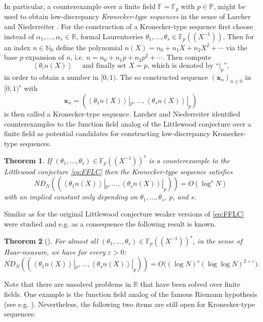 \documentclass{article}
\newcommand{\bsx}{\boldsymbol{x}}%
\newcommand{\NN}{\mathbb N}
\newcommand{\RR}{\mathbb R}
\newcommand{\PP}{\mathbb P}
\newcommand{\FF}{\mathbb{F}}
\renewcommand{\(}{\left (}
\renewcommand{\)}{\right )}
\newtheorem{theorem}{Theorem}[section]
\theoremstyle{definition}
\numberwithin{equation}{section}
\begin{document}
In particular, a counterexample over a finite field $\FF=\FF_p$ with $p\in\PP$, might be used to obtain low-discrepancy \textit{Kronecker-type sequences} in the sense of Larcher and Niederreiter \cite{LarNie1993}. %
For the construction of a Kronecker-type sequence first choose instead of $\alpha_1,\ldots,\alpha_s\in\RR$, formal Laurentseries $\theta_1,\ldots,\theta_s\in\FF_p((X^{-1}))$. Then for an index $n\in\NN_0$ define the polynomial $n(X)=n_0+n_1X+n_2X^2+\cdots$ via the base $p$ expansion of $n$, i.e. $n=n_0+n_1p+n_2p^2+\cdots$. Then compute 
$$\left<  \theta_i n(X)\right>\quad\mbox{ and finally set  $X=p$, which is denoted by ``$|_p$'',}$$
in order to obtain a number in $[0,1)$. 
The so constructed sequence $(\bsx_n)_{n\geq 0}$ in $[0,1)^s$ with 
$$\bsx_n=(\left<  \theta_1 n(X)\right>|_p,\ldots,\left<  \theta_s n(X)\right>|_p)$$ 
is then called a Kronecker-type sequence. Larcher and Niederreiter \cite[Theorem~2]{LarNie1993} identified counterexamples to the function field analog of the Littlewood conjecture over a finite field as potential candidates for constructing low-discrepancy Kronecker-type sequences. 
\begin{theorem} If $(\theta_1,\ldots,\theta_s)\in\FF_p((X^{-1}))^s$ is a counterexample to the Littlewood conjecture \eqref{eq:FFLC} then 
	the Kronecker-type sequence satisfies 
	$$ND_N((\left<  \theta_1 n(X)\right>|_p,\ldots,\left<  \theta_s n(X)\right>|_p))=O(\log^s N)$$
	with an implied constant only depending on $\theta_1,\ldots,\theta_s$, $p$, and $s$. 
\end{theorem}


Similar as for the original Littlewood conjecture weaker versions of \eqref{eq:FFLC} were studied and e.g. as a consequence the following result is known.  
\begin{theorem}[\cite{Lar1995}]
	For almost all $(\theta_1,\ldots,\theta_s)\in\FF_p((X^{-1}))^s$, in the sense of Haar-measure, we have for every $\varepsilon>0$: 
	$$ND_N((\left<  \theta_1 n(X)\right>|_p,\ldots,\left<  \theta_s n(X)\right>|_p))=O\big((\log N)^s (\log\log  N)^{2+\varepsilon}\big)  .$$
\end{theorem}
Note that there are unsolved problems in $\RR$ that have been solved over finite fields. One example is the function field analog of the famous Riemann hypothesis (see e.g. \cite{Fra2014}). 
Nevertheless, the following two items are still open for Kronecker-type sequences:
\end{document}
